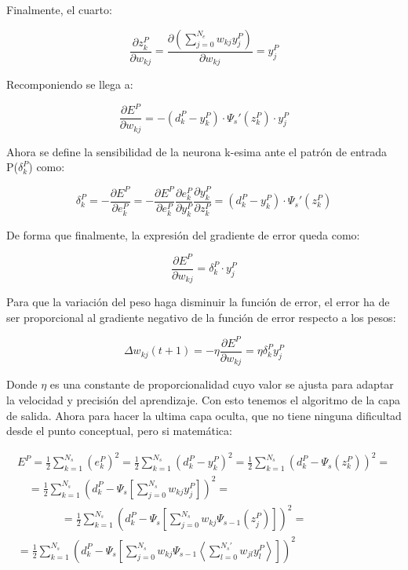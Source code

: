 \documentclass[12pt]{article}
\numberwithin{equation}{section}
\begin{document}
{Finalmente, el cuarto:

\begin{equation}
\frac{\partial z^P_k}{\partial w_{kj}}=\frac{\partial \left(\sum_{j=0}^{N_e} w_{kj} y_j^P\right)}{\partial w_{kj}} = y_j^P
\end{equation}

Recomponiendo se llega a:

\begin{equation}
\frac{\partial E^P}{\partial w_{kj}} =
-(d_k^P-y_k^P) \cdot \Psi _s'(z_k^P) \cdot y_j^P
\end{equation}

Ahora se define la sensibilidad de la neurona k-esima ante el patrón de entrada P($\delta_k^P$) como:

\begin{equation}
\delta _k^P = - \frac{\partial E^P}{\partial e^P_k}=-
\frac{\partial E^P}{\partial e_{k}^P} \frac{\partial e^P_k}{\partial y_{k}^P} \frac{\partial y^P_k}{\partial z_{k}^P} = (d_k^P-y_k^P) \cdot \Psi _s'(z_k^P)
\end{equation}

De forma que finalmente, la expresión del gradiente de error queda como:

\begin{equation}
\frac{\partial E^P}{\partial w_{kj}} = \delta_k^P \cdot y_j^P
\end{equation}

Para que la variación del peso haga disminuir la función de error, el error ha de ser proporcional al gradiente negativo de la función de error respecto a los pesos:

\begin{equation}
\Delta w_{kj}(t+1) = -\eta \frac{\partial E^P}{\partial w_{kj}} = \eta \delta_k^P y_j^P
\end{equation}

Donde $\eta$ es una constante de proporcionalidad cuyo valor se ajusta para adaptar la velocidad y precisión del aprendizaje. Con esto tenemos el algoritmo de la capa de salida. Ahora para hacer la ultima capa oculta, que no tiene ninguna dificultad desde el punto conceptual, pero si matemática:

\begin{multline}
E^P = \frac{1}{2} \sum_{k=1}^{N_s} (e_k^P)^2=\frac{1}{2}\sum_{k=1}^{N_s}(d_k^P-y_k^P)^2 =  \frac{1}{2} \sum_{k=1}^{N_s} \left(d_k^P - \Psi _s(z_k^P)\right)^2 =\\
\quad = \frac{1}{2} \sum_{k=1}^{N_s} \left(d_k^P - \Psi _s \left[ \sum_{j=0}^{N_s} w_{kj} y_j^P\right]\right)^2 = \\
\qquad \qquad = \frac{1}{2} \sum_{k=1}^{N_s} \left(d_k^P - \Psi _s \left[ \sum_{j=0}^{N_s} w_{kj}\Psi _{s-1}(z_j^P)\right]\right)^2 =\\
= \frac{1}{2} \sum_{k=1}^{N_s} \left(d_k^P - \Psi _s \left[ \sum_{j=0}^{N_s} w_{kj}\Psi _{s-1} \left\langle \sum_{l=0}^{N_s'} w_{jl} y_l^P\right\rangle \right] \right)^2
\end{multline}

}
\end{document}
